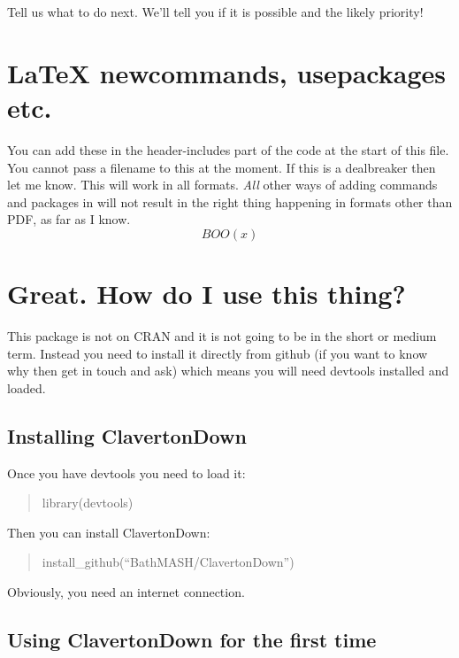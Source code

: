 \documentclass[
  12pt,
  a4paper]{extarticle}
\theoremstyle{plain}
\theoremstyle{definition}
\theoremstyle{plain}
\theoremstyle{plain}
\theoremstyle{plain}
\theoremstyle{plain}
\theoremstyle{definition}
\theoremstyle{definition}
\theoremstyle{remark}
\theoremstyle{remark}
\renewcommand{\;}{\,}
\begin{document}
Tell us what to do next. We'll tell you if it is possible and the likely priority!

\hypertarget{latex-newcommands-usepackages-etc.}{%
\section{LaTeX newcommands, usepackages etc.}\label{latex-newcommands-usepackages-etc.}}

You can add these in the header-includes part of the code at the start of this file. You cannot pass a filename to this at the moment. If this is a dealbreaker then let me know. This will work in all formats. \emph{All} other ways of adding commands and packages in will not result in the right thing happening in formats other than PDF, as far as I know.
\[
BOO(x)
\]

\hypertarget{great.-how-do-i-use-this-thing}{%
\section{Great. How do I use this thing?}\label{great.-how-do-i-use-this-thing}}

This package is not on CRAN and it is not going to be in the short or medium term. Instead you need to install it directly from github (if you want to know why then get in touch and ask) which means you will need devtools installed and loaded.

\hypertarget{installing-clavertondown}{%
\subsection{Installing ClavertonDown}\label{installing-clavertondown}}

Once you have devtools you need to load it:

\begin{quote}
library(devtools)
\end{quote}

Then you can install ClavertonDown:

\begin{quote}
install\_github(``BathMASH/ClavertonDown'')
\end{quote}

Obviously, you need an internet connection.

\hypertarget{using-clavertondown-for-the-first-time}{%
\subsection{Using ClavertonDown for the first time}\label{using-clavertondown-for-the-first-time}}
\end{document}
